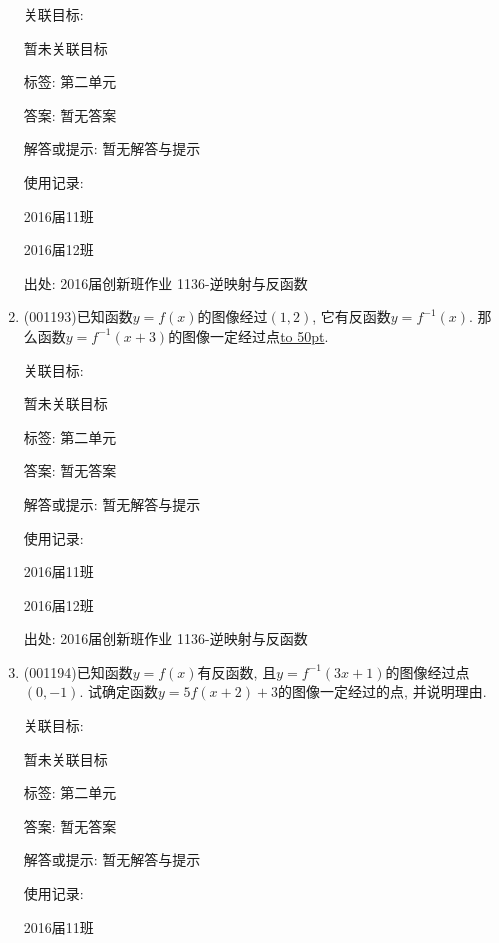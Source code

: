 \documentclass[10pt,a4paper]{article}
\newcommand{\blank}[1]{\underline{\hbox to #1pt{}}}
\begin{document}
\begin{enumerate}[1.]
关联目标:

暂未关联目标



标签: 第二单元

答案: 暂无答案

解答或提示: 暂无解答与提示

使用记录:

2016届11班							

2016届12班							


出处: 2016届创新班作业	1136-逆映射与反函数
\item { (001193)}已知函数$y=f(x)$的图像经过$(1,2)$, 它有反函数$y=f^{-1}(x)$. 那么函数$y=f^{-1}(x+3)$的图像一定经过点\blank{50}.


关联目标:

暂未关联目标



标签: 第二单元

答案: 暂无答案

解答或提示: 暂无解答与提示

使用记录:

2016届11班	

2016届12班	


出处: 2016届创新班作业	1136-逆映射与反函数
\item { (001194)}已知函数$y=f(x)$有反函数, 且$y=f^{-1}(3x+1)$的图像经过点$(0,-1)$. 试确定函数$y=5f(x+2)+3$的图像一定经过的点, 并说明理由.


关联目标:

暂未关联目标



标签: 第二单元

答案: 暂无答案

解答或提示: 暂无解答与提示

使用记录:

2016届11班	


\end{enumerate}
\end{document}
